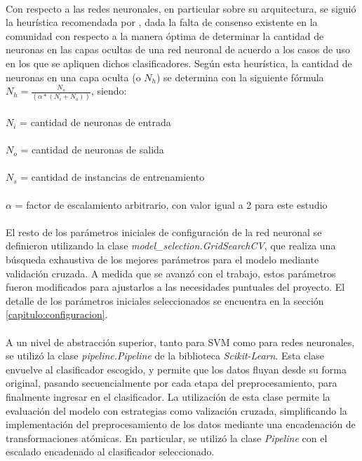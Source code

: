 \paragraph{} Con respecto a las redes neuronales, en particular sobre su arquitectura, se siguió la heurística recomendada por \citet{bib-heuristic-hobs}, dada la falta de consenso existente en la comunidad con respecto a la manera óptima de determinar la cantidad de neuronas en las capas ocultas de una red neuronal de acuerdo a los casos de uso en los que se apliquen dichos clasificadores.
Según esta heurística, la cantidad de neuronas en una capa oculta (o $N_h$) se determina con la siguiente fórmula $N_h = \frac{N_s} {(\alpha * (N_i + N_o))}$, siendo:
\\
\\
$N_i$ = cantidad de neuronas de entrada
\\
\\
$N_o$ = cantidad de neuronas de salida
\\
\\
$N_s$ = cantidad de instancias de entrenamiento
\\
\\
$\alpha$ = factor de escalamiento arbitrario, con valor igual a 2 para este estudio

\paragraph{} El resto de los parámetros iniciales de configuración de la red neuronal se definieron utilizando la clase \textit{model\_selection.GridSearchCV}, que realiza una búsqueda exhaustiva de los mejores parámetros para el modelo mediante validación cruzada.
A medida que se avanzó con el trabajo, estos parámetros fueron modificados para ajustarlos a las necesidades puntuales del proyecto.
El detalle de los parámetros iniciales seleccionados se encuentra en la sección \ref{capitulo:configuracion}.

\paragraph{} A un nivel de abstracción superior, tanto para SVM como para redes neuronales, se utilizó la clase \textit{pipeline.Pipeline} de la biblioteca \textit{Scikit-Learn}.
Esta clase envuelve al clasificador escogido, y permite que los datos fluyan desde su forma original, pasando secuencialmente por cada etapa del preprocesamiento, para finalmente ingresar en el clasificador.
La utilización de esta clase permite la evaluación del modelo con estrategias como valización cruzada, simplificando la implementación del preprocesamiento de los datos mediante una encadenación de transformaciones atómicas.
En particular, se utilizó la clase \textit{Pipeline} con el escalado encadenado al clasificador seleccionado. 

